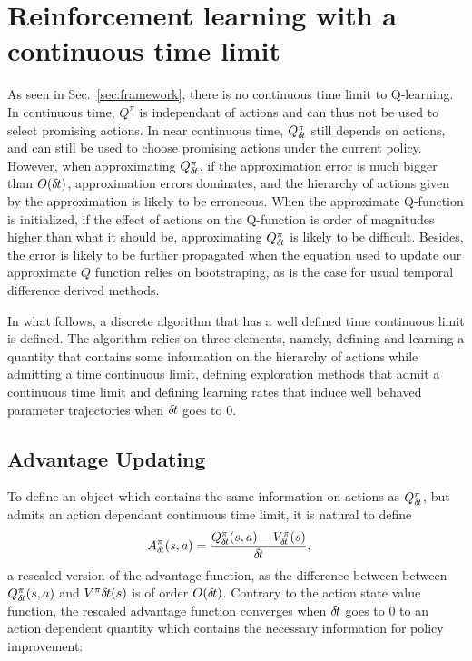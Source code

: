 \section{Reinforcement learning with a continuous time limit}
As seen in Sec.~\ref{sec:framework}, there is no continuous time limit to
Q-learning. In continuous time, $Q^\pi$ is independant of actions and can thus
not be used to select promising actions.  In near continuous time, $Q^\pi_{\delta\hspace{-.1em}t}$
still depends on actions, and can still be used to choose promising actions
under the current policy. However, when approximating $Q^\pi_{\delta\hspace{-.1em}t}$, if the
approximation error is much bigger than $O({\delta\hspace{-.1em}t})$, approximation errors
dominates, and the hierarchy of actions given by the approximation is likely to
be erroneous.  When the approximate Q-function is initialized, if the effect of
actions on the Q-function is order of magnitudes higher than what it should be,
approximating $Q^\pi_{\delta\hspace{-.1em}t}$ is likely to be difficult. Besides, the error is likely
to be further propagated when the equation used to update our approximate $Q$
function relies on bootstraping, as is the case for usual temporal difference
derived methods.

In what follows, a discrete algorithm that has a well defined time continuous
limit is defined. The algorithm relies on three elements, namely, defining and
learning a quantity that contains some information on the hierarchy of actions
while admitting a time continuous limit, defining exploration methods that
admit a continuous time limit and defining learning rates that induce well
behaved parameter trajectories when ${\delta\hspace{-.1em}t}$ goes to $0$.

\subsection{Advantage Updating}
\label{subsec:reparam}
To define an object which contains the same information on actions as
$Q^\pi_{\delta\hspace{-.1em}t}$, but admits an action dependant continuous time limit, it is
natural to define
\begin{align}
	A^\pi_{\delta\hspace{-.1em}t}(s, a) &= \frac{Q^\pi_{\delta\hspace{-.1em}t}(s,a) - V^\pi_{\delta\hspace{-.1em}t}(s)}{{\delta\hspace{-.1em}t}},
    \label{eq:adv}
\end{align}
a rescaled version of the advantage function, as the difference between between
$Q^\pi_{\delta\hspace{-.1em}t}(s, a)$ and $V^\pi{\delta\hspace{-.1em}t}(s)$ is of order $O({\delta\hspace{-.1em}t})$.
Contrary to the action state value function, the rescaled advantage function converges when ${\delta\hspace{-.1em}t}$ goes to $0$
to an action dependent quantity which contains the necessary information for policy improvement:



